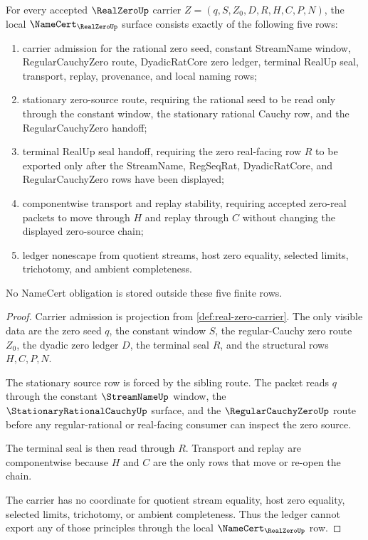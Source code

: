 \begin{theorem}
\label{thm:real-zero-namecert-obligations}
For every accepted $\RealZeroUp$ carrier $Z=(q,S,Z_0,D,R,H,C,P,N)$, the local $\NameCert_{\RealZeroUp}$ surface consists exactly of the following five rows:
\begin{enumerate}
\item carrier admission for the rational zero seed, constant StreamName window, RegularCauchyZero route, DyadicRatCore zero ledger, terminal RealUp seal, transport, replay, provenance, and local naming rows;
\item stationary zero-source route, requiring the rational seed to be read only through the constant window, the stationary rational Cauchy row, and the RegularCauchyZero handoff;
\item terminal RealUp seal handoff, requiring the zero real-facing row $R$ to be exported only after the StreamName, RegSeqRat, DyadicRatCore, and RegularCauchyZero rows have been displayed;
\item componentwise transport and replay stability, requiring accepted zero-real packets to move through $H$ and replay through $C$ without changing the displayed zero-source chain;
\item ledger nonescape from quotient streams, host zero equality, selected limits, trichotomy, and ambient completeness.
\end{enumerate}
No NameCert obligation is stored outside these five finite rows.
\end{theorem}
\begin{proof}
Carrier admission is projection from \autoref{def:real-zero-carrier}. The only visible data are the zero seed $q$, the constant window $S$, the regular-Cauchy zero route $Z_0$, the dyadic zero ledger $D$, the terminal seal $R$, and the structural rows $H,C,P,N$.

The stationary source row is forced by the sibling route. The packet reads $q$ through the constant $\StreamNameUp$ window, the $\StationaryRationalCauchyUp$ surface, and the $\RegularCauchyZeroUp$ route before any regular-rational or real-facing consumer can inspect the zero source.

The terminal seal is then read through $R$. Transport and replay are componentwise because $H$ and $C$ are the only rows that move or re-open the chain.

The carrier has no coordinate for quotient stream equality, host zero equality, selected limits, trichotomy, or ambient completeness. Thus the ledger cannot export any of those principles through the local $\NameCert_{\RealZeroUp}$ row.
\end{proof}

